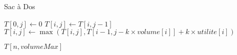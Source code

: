 \begin{algorithm}[H]
	\caption{Sac à Dos}
	\label{algo_dyn_bag}
	\begin{algorithmic}[1]
				\STATE $T[0, j] \leftarrow 0$
		\ENDFOR
					\STATE $T[i, j] \leftarrow T[i, j-1]$
				\ENDIF
					\STATE $T[i,j] \leftarrow \max(T[i,j], T[i-1,j-k \times volume[i]] + k \times utilite[i])$
				\ENDFOR
			\ENDFOR
		\ENDFOR
	
	\RETURN $T[n,volumeMax]$
	\end{algorithmic}
\end{algorithm}

